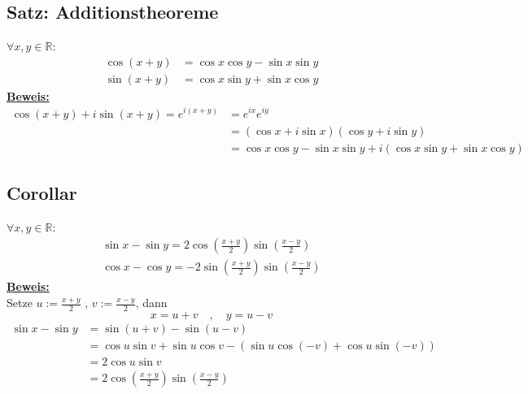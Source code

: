 \subsection{Satz: Additionstheoreme} %
\label{sub:satz_additionstheoreme}
$\forall x,y \in \mathds{R} : $ 
\begin{align*}
	\cos (x+y)  &= \cos x \cos y - \sin x \sin y \\
	\sin (x+y) &= \cos x \sin y + \sin x \cos y
\end{align*}
\underline{\textbf{Beweis:}} 
\begin{align*}
	\cos (x+y) + i \sin (x+y) = e^{i(x+y)} &= e^{ix} e^{iy} \\
	&= (\cos x + i \sin x) ( \cos y + i \sin y) \\
	&= \cos x \cos y - \sin x \sin y + i (\cos x \sin y + \sin x \cos y)
\end{align*}

\subsection{Corollar} %
\label{sub:corollar}
$\forall x,y \in \mathds{R}:$
\begin{align*}
	\sin x - \sin y = 2 \cos \left(\frac{x+y}{2}\right) \sin \left(\frac{x-y}{2} \right) \\
	\cos x - \cos y = -2 \sin \left(\frac{x+y}{2} \right) \sin \left( \frac{x-y}{2} \right)
\end{align*}
\underline{\textbf{Beweis:}} \\
Setze $u:= \frac{x+y}{2} $ , $v:= \frac{x-y}{2} $, dann
\[
	x= u+v \quad , \quad y= u-v
\]
\begin{align*}
	\sin x - \sin y &= \sin (u+v) - \sin (u-v) \\
	&= \cos u \sin v + \sin u \cos v - (\sin u \cos (-v) + \cos u \sin (-v)) \\
	&= 2 \cos u \sin v \\
	&= 2 \cos \left(\frac{x+y}{2} \right) \sin \left(\frac{x-y}{2} \right)
\end{align*}

